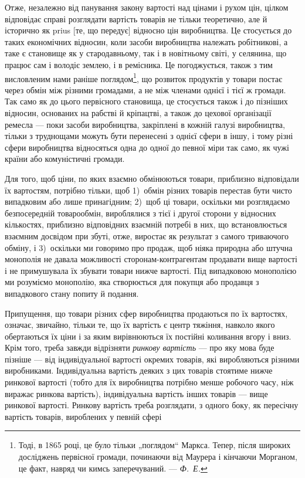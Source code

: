 
Отже, незалежно від панування закону вартості над цінами
і рухом цін, цілком відповідає справі розглядати вартість товарів
не тільки теоретично, але й історично як prius [те, що передує]
відносно цін виробництва. Це стосується до таких економічних
відносин, коли засоби виробництва належать робітникові,
а таке є становище як у стародавньому, так і в новітньому
світі, у селянина, що працює сам і володіє землею, і в ремісника.
Це погоджується, також з тим висловленим нами раніше
поглядом\footnote{
Тоді, в 1865 році, це було тільки „поглядом“ Маркса. Тепер, після широких
досліджень первісної громади, починаючи від Маурера і кінчаючи Морганом,
це факт, навряд чи кимсь заперечуваний. — \emph{Ф.~Е.}
}, що розвиток продуктів у товари постає через обмін
між різними громадами, а не між членами однієї і тієї ж громади.
Так само як до цього первісного становища, це стосується
також і до пізніших відносин, основаних на рабстві
й кріпацтві, а також до цехової організації ремесла — поки засоби
виробництва, закріплені в кожній галузі виробництва, тільки
з труднощами можуть бути перенесені з однієї сфери в іншу,
і тому різні сфери виробництва відносяться одна до одної
до певної міри так само, як чужі країни або комуністичні
громади.

Для того, щоб ціни, по яких взаємно обмінюються товари,
приблизно відповідали їх вартостям, потрібно тільки, щоб 1)~обмін
різних товарів перестав бути чисто випадковим або лише
принагідним; 2)~щоб ці товари, оскільки ми розглядаємо безпосередній
товарообмін, вироблялися з тієї і другої сторони у відносних
кількостях, приблизно відповідних взаємній потребі в них,
що встановлюється взаємним досвідом при збуті, отже, виростає
як результат з самого триваючого обміну, і 3)~оскільки ми
говоримо про продаж, щоб ніяка природна або штучна монополія
не давала можливості сторонам-контрагентам продавати
вище вартості і не примушувала їх збувати товари нижче вартості.
Під випадковою монополією ми розуміємо монополію, яка створюється
для покупця або продавця з випадкового стану попиту
й подання.

Припущення, що товари різних сфер виробництва продаються
по їх вартостях, означає, звичайно, тільки те, що їх вартість
є центр тяжіння, навколо якого обертаються їх ціни і за яким
вирівнюються їх постійні коливання вгору і вниз. Крім того,
треба завжди відрізняти \emph{ринкову вартість} — про яку мова буде
пізніше — від індивідуальної вартості окремих товарів, які виробляються
різними виробниками. Індивідуальна вартість деяких
з цих товарів стоятиме нижче ринкової вартості (тобто для їх
виробництва потрібно менше робочого часу, ніж виражає ринкова
вартість), індивідуальна вартість інших товарів — вище
ринкової вартості. Ринкову вартість треба розглядати, з одного
боку, як пересічну вартість товарів, вироблених у певній сфері
\parbreak{}  %
